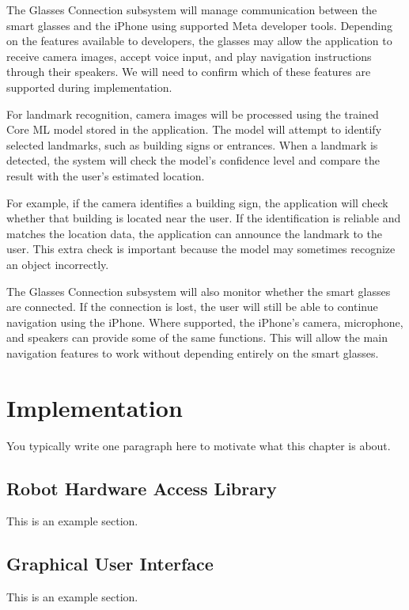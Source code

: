 \documentclass[12pt,letterpaper,oneside,reqno]{book}
\theoremstyle{plain}
\theoremstyle{definition}
\theoremstyle{plain}
\theoremstyle{remark}
\theoremstyle{plain}
\theoremstyle{definition}
\theoremstyle{plain}
\begin{document}
The Glasses Connection subsystem will manage communication between the smart glasses and the iPhone using supported Meta developer tools. Depending on the features available to developers, the glasses may allow the application to receive camera images, accept voice input, and play navigation instructions through their speakers. We will need to confirm which of these features are supported during implementation.

For landmark recognition, camera images will be processed using the trained Core ML model stored in the application. The model will attempt to identify selected landmarks, such as building signs or entrances. When a landmark is detected, the system will check the model's confidence level and compare the result with the user's estimated location.

For example, if the camera identifies a building sign, the application will check whether that building is located near the user. If the identification is reliable and matches the location data, the application can announce the landmark to the user. This extra check is important because the model may sometimes recognize an object incorrectly.

The Glasses Connection subsystem will also monitor whether the smart glasses are connected. If the connection is lost, the user will still be able to continue navigation using the iPhone. Where supported, the iPhone's camera, microphone, and speakers can provide some of the same functions. This will allow the main navigation features to work without depending entirely on the smart glasses.

\par
\endgroup

\chapter{Implementation}
You typically write one paragraph here to motivate what this chapter is about.

\section{Robot Hardware Access Library}
This is an example section.

\section{Graphical User Interface}
This is an example section.
\end{document}
